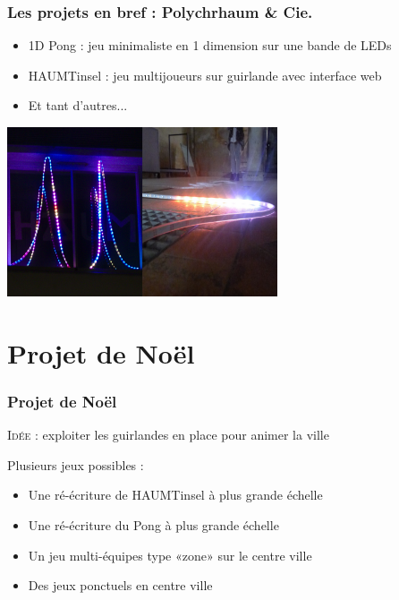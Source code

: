 \documentclass[10pt, compress]{beamer}
\begin{document}
\begin{frame}[fragile]
	\frametitle{Les projets en bref : Polychrhaum \& Cie.}

	\begin{itemize}
		\item \alert{1D Pong} : jeu minimaliste en 1 dimension sur une bande de LEDs
		\item \alert{HAUMTinsel} : jeu multijoueurs sur guirlande avec interface web
		\item Et tant d'autres...
	\end{itemize}

	\begin{center}
		\includegraphics[width=0.6\textwidth]{lights.png}
	\end{center}
\end{frame}

\section{Projet de Noël}

\begin{frame}
	\frametitle{Projet de Noël}

	\alert{\textsc{Idée} :} exploiter les guirlandes en place pour animer la ville

	\pause

	Plusieurs jeux possibles :

	\begin{itemize}[<+->]
		\item Une ré-écriture de \alert{HAUMTinsel} à plus grande échelle
		\item Une ré-écriture du \alert{Pong} à plus grande échelle
		\item Un jeu multi-équipes type \alert{«zone»} sur le centre ville
		\item Des \alert{jeux ponctuels} en centre ville
	\end{itemize}
\end{frame}
\end{document}
